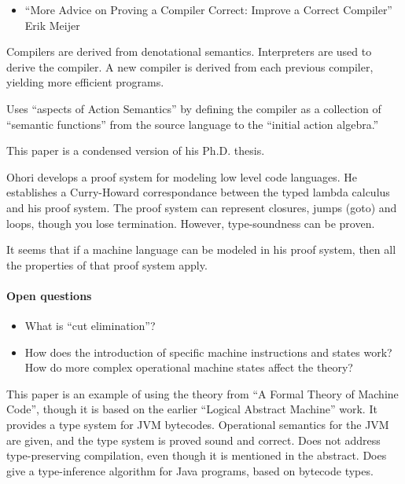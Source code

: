 \documentclass[11pt]{article}
\begin{document}
\begin{itemize}
\item ``More Advice on Proving a Compiler Correct: Improve a Correct Compiler''
Erik Meijer
\end{itemize}

Compilers are derived from denotational semantics. Interpreters are used to
derive the compiler. A new compiler is derived from each previous compiler, yielding
more efficient programs. 

Uses ``aspects of Action Semantics'' by defining the compiler as a collection of
``semantic functions'' from the source language to the ``initial action algebra.''

This paper is a condensed version of his Ph.D. thesis.


Ohori develops a proof system for modeling low level code
languages. He establishes a Curry-Howard correspondance between the
typed lambda calculus and his proof system. The proof system can represent
closures, jumps (goto) and loops, though you lose termination. However, type-soundness
can be proven. 

It seems that if a machine language can be modeled in his proof
system, then all the properties of that proof system apply.

\paragraph{Open questions}

\begin{itemize}
\item What is ``cut elimination''?
\item How does the introduction of specific machine instructions and states work? How do more
  complex operational machine states affect the theory?
\end{itemize}


This paper is an example of using the theory from ``A Formal Theory of
Machine Code'', though it is based on the earlier ``Logical Abstract
Machine'' work. It provides a type system for JVM
bytecodes. Operational semantics for the JVM are given, and the type
system is proved sound and correct. Does not address type-preserving
compilation, even though it is mentioned in the abstract. Does give a
type-inference algorithm for Java programs, based on bytecode types.
\end{document}
